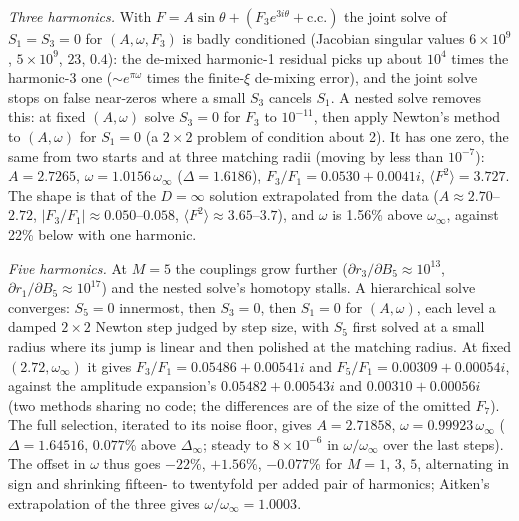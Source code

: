 \documentclass[aps,prd,onecolumn,superscriptaddress,nofootinbib,10pt]{revtex4-2}
\newcommand{\Dinf}{\Delta_\infty}
\begin{document}
\emph{Three harmonics.} With $F = A\sin\theta + (F_3e^{3i\theta} + \mathrm{c.c.})$ the joint solve of $S_1 = S_3 = 0$ for
$(A, \omega, F_3)$ is badly conditioned (Jacobian singular values $6\times10^9$, $5\times10^9$, $23$, $0.4$): the de-mixed
harmonic-1 residual picks up about $10^4$ times the harmonic-3 one ($\sim e^{\pi\omega}$ times the finite-$\xi$ de-mixing
error), and the joint solve stops on false near-zeros where a small $S_3$ cancels $S_1$. A nested solve removes this:
at fixed $(A, \omega)$ solve $S_3 = 0$ for $F_3$ to $10^{-11}$, then apply Newton's method to $(A, \omega)$ for $S_1 = 0$ (a $2\times2$ problem of
condition about 2). It has one zero, the same from two starts and at three matching radii (moving by less than
$10^{-7}$): $A = 2.7265$, $\omega = 1.0156\,\omega_\infty$ ($\Delta = 1.6186$), $F_3/F_1 = 0.0530 + 0.0041i$,
$\langle F^2\rangle = 3.727$. The shape is that of the $D = \infty$ solution extrapolated from the data
($A \approx 2.70$--$2.72$, $|F_3/F_1| \approx 0.050$--$0.058$, $\langle F^2\rangle \approx 3.65$--$3.7$), and $\omega$ is 1.56\%
above $\omega_\infty$, against 22\% below with one harmonic.

\emph{Five harmonics.} At $M = 5$ the couplings grow further ($\partial r_3/\partial B_5 \approx 10^{13}$,
$\partial r_1/\partial B_5 \approx 10^{17}$) and the nested solve's homotopy stalls. A hierarchical solve converges: $S_5 = 0$
innermost, then $S_3 = 0$, then $S_1 = 0$ for $(A, \omega)$, each level a damped $2\times2$ Newton step judged by step size, with
$S_5$ first solved at a small radius where its jump is linear and then polished at the matching radius. At fixed
$(2.72, \omega_\infty)$ it gives $F_3/F_1 = 0.05486 + 0.00541i$ and $F_5/F_1 = 0.00309 + 0.00054i$, against the amplitude
expansion's $0.05482 + 0.00543i$ and $0.00310 + 0.00056i$ (two methods sharing no code; the differences are of the size of
the omitted $F_7$). The full selection, iterated to its noise floor, gives $A = 2.71858$, $\omega = 0.99923\,\omega_\infty$
($\Delta = 1.64516$, $0.077\%$ above $\Dinf$; steady to $8\times10^{-6}$ in $\omega/\omega_\infty$ over the last steps). The offset in
$\omega$ thus goes $-22\%$, $+1.56\%$, $-0.077\%$ for $M = 1$, $3$, $5$, alternating in sign and shrinking fifteen- to twentyfold
per added pair of harmonics; Aitken's extrapolation of the three gives $\omega/\omega_\infty = 1.0003$.
\end{document}
